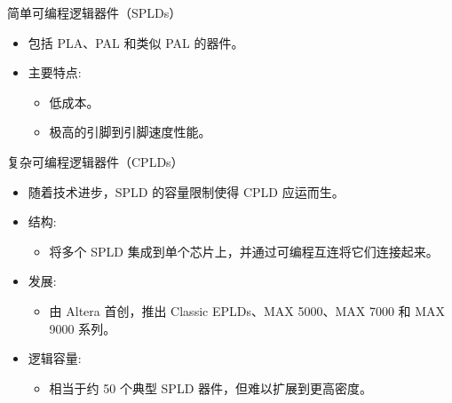 \documentclass[
  ignorenonframetext,
  chinese,
]{beamer}
\providecommand{\tightlist}{%
  \setlength{\itemsep}{0pt}\setlength{\parskip}{0pt}}
\begin{document}
\begin{frame}
\begin{block}{简单可编程逻辑器件（SPLDs）}
\label{ux7b80ux5355ux53efux7f16ux7a0bux903bux8f91ux5668ux4ef6splds}
\begin{itemize}
\tightlist
\item
  包括 PLA、PAL 和类似 PAL 的器件。
\item
  主要特点:

  \begin{itemize}
  \tightlist
  \item
    低成本。
  \item
    极高的引脚到引脚速度性能。
  \end{itemize}
\end{itemize}
\end{block}

\begin{block}{复杂可编程逻辑器件（CPLDs）}
\label{ux590dux6742ux53efux7f16ux7a0bux903bux8f91ux5668ux4ef6cplds}
\begin{itemize}
\tightlist
\item
  随着技术进步，SPLD 的容量限制使得 CPLD 应运而生。
\item
  结构:

  \begin{itemize}
  \tightlist
  \item
    将多个 SPLD 集成到单个芯片上，并通过可编程互连将它们连接起来。
  \end{itemize}
\item
  发展:

  \begin{itemize}
  \tightlist
  \item
    由 Altera 首创，推出 Classic EPLDs、MAX 5000、MAX 7000 和 MAX 9000
    系列。
  \end{itemize}
\item
  逻辑容量:

  \begin{itemize}
  \tightlist
  \item
    相当于约 50 个典型 SPLD 器件，但难以扩展到更高密度。
  \end{itemize}
\end{itemize}
\end{block}
\end{frame}
\end{document}
